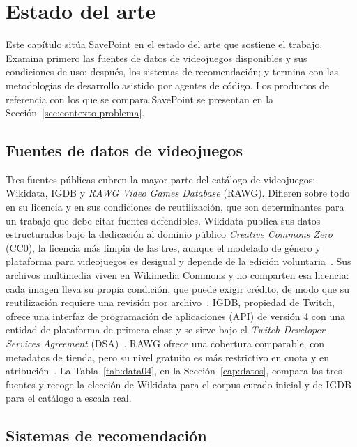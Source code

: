 \chapter{Estado del arte}\label{cap:estado-del-arte}

Este capítulo sitúa SavePoint en el estado del arte que sostiene el trabajo. Examina primero
las fuentes de datos de videojuegos disponibles y sus condiciones de uso; después, los sistemas
de recomendación; y termina con las metodologías de desarrollo asistido por agentes de código.
Los productos de referencia con los que se compara SavePoint se presentan en la
Sección~\ref{sec:contexto-problema}.

\section{Fuentes de datos de videojuegos}\label{sec:arte-datos}

Tres fuentes públicas cubren la mayor parte del catálogo de videojuegos: Wikidata, IGDB y
\textit{RAWG Video Games Database} (RAWG). Difieren sobre todo en su licencia y en sus condiciones de reutilización, que son
determinantes para un trabajo que debe citar fuentes defendibles. Wikidata publica sus datos
estructurados bajo la dedicación al dominio público \textit{Creative Commons Zero} (CC0), la
licencia más limpia de las tres, aunque el modelado de género y plataforma para videojuegos es
desigual y depende de la edición voluntaria~\cite{wikidata-licensing}. Sus archivos
multimedia viven en Wikimedia Commons y no comparten esa licencia: cada imagen lleva su propia
condición, que puede exigir crédito, de modo que su reutilización requiere una revisión por
archivo~\cite{commons-reuse}. IGDB, propiedad de Twitch, ofrece una interfaz de programación de aplicaciones (API) de versión 4 con una
entidad de plataforma de primera clase y se sirve bajo el \textit{Twitch Developer Services
Agreement} (DSA)~\cite{igdb-api, twitch-dsa}. RAWG ofrece una cobertura comparable, con
metadatos de tienda, pero su nivel gratuito es más restrictivo en cuota y en atribución~\cite{rawg-api}.
La Tabla~\ref{tab:data04}, en la Sección~\ref{cap:datos}, compara las tres fuentes y recoge la
elección de Wikidata para el corpus curado inicial y de IGDB para el catálogo a escala real.

\section{Sistemas de recomendación}\label{sec:arte-recomendacion}

